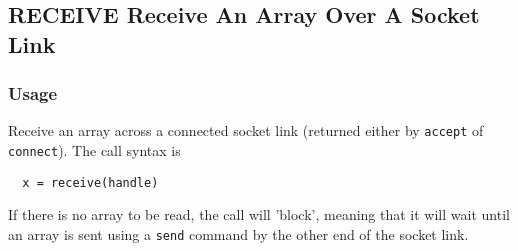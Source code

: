 %
%
%
\subsection{RECEIVE Receive An Array Over A Socket Link}
\subsubsection{Usage}
Receive an array across a connected socket link (returned
either by \verb|accept| of \verb|connect|).  The call syntax is
\begin{verbatim}
  x = receive(handle)
\end{verbatim}
If there is no array to be read, the call will 'block', meaning
that it will wait until an array is sent using a \verb|send| command
by the other end of the socket link.

